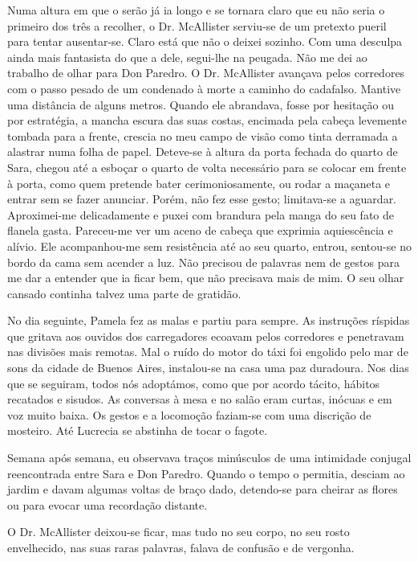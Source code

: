 Numa altura em que o serão já ia longo e se tornara claro que eu não
seria o primeiro dos três a recolher, o Dr. McAllister serviu-se de um
pretexto pueril para tentar ausentar-se. Claro está que não o deixei
sozinho. Com uma desculpa ainda mais fantasista do que a dele, segui-lhe
na peugada. Não me dei ao trabalho de olhar para Don Paredro. O Dr.
McAllister avançava pelos corredores com o passo pesado de um condenado à morte a caminho do cadafalso. Mantive uma distância de alguns
metros. Quando ele abrandava, fosse por hesitação ou por estratégia, a
mancha escura das suas costas, encimada pela cabeça levemente tombada
para a frente, crescia no meu campo de visão como tinta derramada a
alastrar numa folha de papel. Deteve-se à altura da porta fechada do
quarto de Sara, chegou até a esboçar o quarto de volta necessário para
se colocar em frente à porta, como quem pretende bater cerimoniosamente, ou rodar a maçaneta e entrar sem se fazer anunciar. Porém,
não fez esse gesto; limitava-se a aguardar. Aproximei-me delicadamente
e puxei com brandura pela manga do seu fato de flanela gasta. Pareceu-me
ver um aceno de cabeça que exprimia aquiescência e alívio. Ele
acompanhou-me sem resistência até ao seu quarto, entrou, sentou-se no
bordo da cama sem acender a luz. Não precisou de palavras nem de gestos para me dar a entender que ia ficar bem, que não precisava mais de
mim. O seu olhar cansado continha talvez uma parte de gratidão.

No dia seguinte, Pamela fez as malas e partiu para sempre. As
instruções ríspidas que gritava aos ouvidos dos carregadores ecoavam
pelos corredores e penetravam nas divisões mais remotas. Mal o ruído do
motor do táxi foi engolido pelo mar de sons da cidade de Buenos Aires,
instalou-se na casa uma paz duradoura. Nos dias que se seguiram, todos
nós adoptámos, como que por acordo tácito, hábitos recatados e sisudos.
As conversas à mesa e no salão eram curtas, inócuas e em voz muito
baixa. Os gestos e a locomoção faziam-se com uma discrição de mosteiro.
Até Lucrecia se abstinha de tocar o fagote.

Semana após semana, eu observava traços minúsculos de uma intimidade
conjugal reencontrada entre Sara e Don Paredro. Quando o tempo o
permitia, desciam ao jardim e davam algumas voltas de braço dado,
detendo-se para cheirar as flores ou para evocar uma recordação
distante.

O Dr. McAllister deixou-se ficar, mas tudo no seu corpo, no seu rosto
envelhecido, nas suas raras palavras, falava de confusão e de vergonha.

